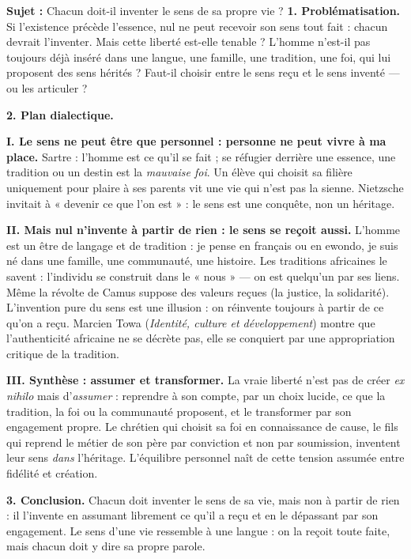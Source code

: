 \documentclass[11pt]{article}
\begin{document}
\begin{exoresolu}
\textbf{Sujet :} Chacun doit-il inventer le sens de sa propre vie ?
\tcblower
\textbf{1. Problématisation.} Si l'existence précède l'essence, nul ne peut recevoir son sens tout fait : chacun devrait l'inventer. Mais cette liberté est-elle tenable ? L'homme n'est-il pas toujours déjà inséré dans une langue, une famille, une tradition, une foi, qui lui proposent des sens hérités ? Faut-il choisir entre le sens reçu et le sens inventé — ou les articuler ?

\textbf{2. Plan dialectique.}

\textbf{I. Le sens ne peut être que personnel : personne ne peut vivre à ma place.} Sartre : l'homme est ce qu'il se fait ; se réfugier derrière une essence, une tradition ou un destin est la \emph{mauvaise foi}. Un élève qui choisit sa filière uniquement pour plaire à ses parents vit une vie qui n'est pas la sienne. Nietzsche invitait à « devenir ce que l'on est » : le sens est une conquête, non un héritage.

\textbf{II. Mais nul n'invente à partir de rien : le sens se reçoit aussi.} L'homme est un être de langage et de tradition : je pense en français ou en ewondo, je suis né dans une famille, une communauté, une histoire. Les traditions africaines le savent : l'individu se construit dans le « nous » — on est quelqu'un par ses liens. Même la révolte de Camus suppose des valeurs reçues (la justice, la solidarité). L'invention pure du sens est une illusion : on réinvente toujours à partir de ce qu'on a reçu. Marcien Towa (\emph{Identité, culture et développement}) montre que l'authenticité africaine ne se décrète pas, elle se conquiert par une appropriation critique de la tradition.

\textbf{III. Synthèse : assumer et transformer.} La vraie liberté n'est pas de créer \emph{ex nihilo} mais d'\emph{assumer} : reprendre à son compte, par un choix lucide, ce que la tradition, la foi ou la communauté proposent, et le transformer par son engagement propre. Le chrétien qui choisit sa foi en connaissance de cause, le fils qui reprend le métier de son père par conviction et non par soumission, inventent leur sens \emph{dans} l'héritage. L'équilibre personnel naît de cette tension assumée entre fidélité et création.

\textbf{3. Conclusion.} Chacun doit inventer le sens de sa vie, mais non à partir de rien : il l'invente en assumant librement ce qu'il a reçu et en le dépassant par son engagement. Le sens d'une vie ressemble à une langue : on la reçoit toute faite, mais chacun doit y dire sa propre parole.
\end{exoresolu}
\end{document}
